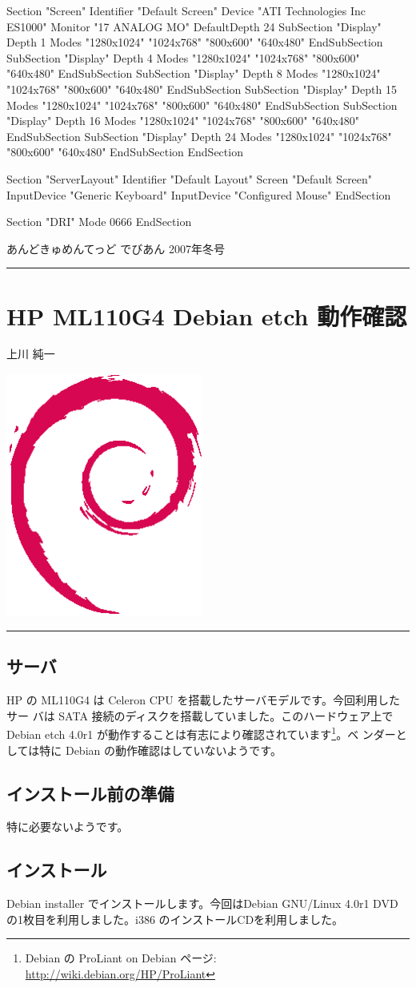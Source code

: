 \documentclass[mingoth,a4paper]{jsarticle}
\renewcommand{\dancersection}[2]{%
\newpage
あんどきゅめんてっど でびあん 2007年冬号
%
\vspace{0.1mm}\\
{\color{dancerlightblue}\rule{\hsize}{2mm}}

%
%
\begin{minipage}[t]{0.7\hsize}
\color{dancerdarkblue}
\vspace{1cm}
\section{#1}
\hfill{}#2\\
\end{minipage}
\begin{minipage}[t]{0.3\hsize}
\vspace{-2cm}
\hfill{}\includegraphics[height=8cm]{image200502/openlogo-nd.eps}\\
\vspace{-5cm}
\end{minipage}
%
%
{\color{dancerdarkblue}\rule{0.74\hsize}{2mm}}
%
\vspace{2cm}
}
\begin{document}
\begin{commandline}
Section "Screen"
	Identifier	"Default Screen"
	Device		"ATI Technologies Inc ES1000"
	Monitor		"17 ANALOG MO"
	DefaultDepth	24
	SubSection "Display"
		Depth		1
		Modes		"1280x1024" "1024x768" "800x600" "640x480"
	EndSubSection
	SubSection "Display"
		Depth		4
		Modes		"1280x1024" "1024x768" "800x600" "640x480"
	EndSubSection
	SubSection "Display"
		Depth		8
		Modes		"1280x1024" "1024x768" "800x600" "640x480"
	EndSubSection
	SubSection "Display"
		Depth		15
		Modes		"1280x1024" "1024x768" "800x600" "640x480"
	EndSubSection
	SubSection "Display"
		Depth		16
		Modes		"1280x1024" "1024x768" "800x600" "640x480"
	EndSubSection
	SubSection "Display"
		Depth		24
		Modes		"1280x1024" "1024x768" "800x600" "640x480"
	EndSubSection
EndSection

Section "ServerLayout"
	Identifier	"Default Layout"
	Screen		"Default Screen"
	InputDevice	"Generic Keyboard"
	InputDevice	"Configured Mouse"
EndSection

Section "DRI"
	Mode	0666
EndSection

\end{commandline}


\dancersection{HP ML110G4 Debian etch 動作確認}{上川 純一}
\label{ML110G4}

\subsection{サーバ}

HP の ML110G4 は Celeron CPU を搭載したサーバモデルです。今回利用したサー
バは SATA 接続のディスクを搭載していました。このハードウェア上でDebian
etch 4.0r1 が動作することは有志により確認されています\footnote{Debian の
ProLiant on Debian ページ: \url{http://wiki.debian.org/HP/ProLiant}}。ベ
ンダーとしては特に Debian の動作確認はしていないようです。

\subsection{インストール前の準備}

特に必要ないようです。

\subsection{インストール}

Debian installer でインストールします。今回はDebian GNU/Linux 4.0r1 DVD 
の1枚目を利用しました。i386 のインストールCDを利用しました。
\end{document}
